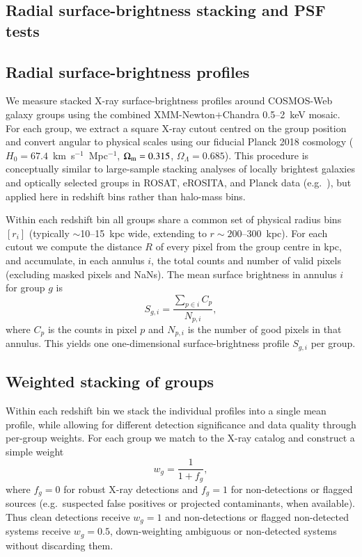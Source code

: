\documentclass{aa}
\begin{document}

\begin{appendix}

\section{Radial surface-brightness stacking and PSF tests}
\label{sec:radial_stack}

\subsection{Radial surface-brightness profiles}

We measure stacked X-ray surface-brightness profiles around COSMOS-Web galaxy groups using the combined XMM-Newton$+$Chandra 0.5--2~keV mosaic. For each group, we extract a square X-ray cutout centred on the group position and convert angular to physical scales using our fiducial Planck 2018 cosmology ($H_0 = 67.4$~km~s$^{-1}$~Mpc$^{-1}$, $\Omega_{\rm m} = 0.315$, $\Omega_\Lambda = 0.685$). This procedure is conceptually similar to large-sample stacking analyses of locally brightest galaxies and optically selected groups in ROSAT, eROSITA, and Planck data (e.g.\ \citealt{Anderson2015,PlanckCollaboration2013,Popesso2025}), but applied here in redshift bins rather than halo-mass bins.

Within each redshift bin all groups share a common set of physical radius bins $[r_i]$ (typically $\sim$10--15~kpc wide, extending to $r \sim 200$--300~kpc). For each cutout we compute the distance $R$ of every pixel from the group centre in kpc, and accumulate, in each annulus $i$, the total counts and number of valid pixels (excluding masked pixels and NaNs). The mean surface brightness in annulus $i$ for group $g$ is
\begin{equation}
S_{g,i} = \frac{\sum_{p \in i} C_p}{N_{p,i}},
\label{eq:Sgi}
\end{equation}
where $C_p$ is the counts in pixel $p$ and $N_{p,i}$ is the number of good pixels in that annulus. This yields one one-dimensional surface-brightness profile $S_{g,i}$ per group.

\subsection{Weighted stacking of groups}

Within each redshift bin we stack the individual profiles into a single mean profile, while allowing for different detection significance and data quality through per-group weights. For each group we match to the X-ray catalog and construct a simple weight
\begin{equation}
w_g = \frac{1}{1 + f_g},
\label{eq:wg}
\end{equation}
where $f_g = 0$ for robust X-ray detections and $f_g = 1$ for non-detections or flagged sources (e.g.\ suspected false positives or projected contaminants, when available). Thus clean detections receive $w_g = 1$ and non-detections or flagged non-detected systems receive $w_g = 0.5$, down-weighting ambiguous or non-detected systems without discarding them.


\end{appendix}
\end{document}
